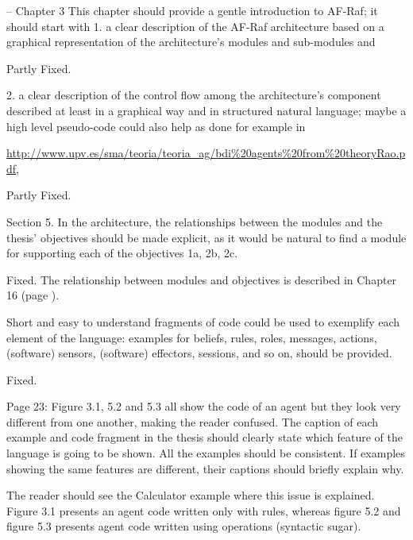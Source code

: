 \documentclass{article}
\newenvironment{them}{\noindent\begingroup\color{blue}}{\endgroup\par}
\begin{document}
\begin{them}

-- Chapter 3
This chapter should provide a gentle introduction to AF-Raf; it should start
with 1. a clear description of the AF-Raf architecture based on a graphical
representation of the architecture's modules and sub-modules and

\end{them}
Partly Fixed. 

\begin{them}

2. a clear description of the control flow among the architecture's component
described at least in a graphical way and in structured natural language; maybe
a high level pseudo-code could also help as done for example in

\url{http://www.upv.es/sma/teoria/teoria_ag/bdi\%20agents\%20from\%20theoryRao.pdf},
\end{them}
Partly Fixed. 

\begin{them}

Section 5.
In the architecture, the relationships between the modules and the thesis'
objectives should be made explicit, as it would be natural to find a module for
supporting each of the objectives 1a, 2b, 2c.

\end{them}
Fixed. The relationship between modules and objectives is described in Chapter
16 (page ).

\begin{them}

Short and easy to understand fragments of code could be used to exemplify each
element of the language: examples for beliefs, rules, roles, messages, actions,
(software) sensors, (software) effectors, sessions, and so on, should be
provided.

\end{them}
Fixed. 

\begin{them}

Page 23:
Figure 3.1, 5.2 and 5.3 all show the code of an agent but they look very
different from one another, making the reader confused. The caption of each
example and code fragment in the thesis should clearly state which feature of
the language is going to be shown. All the examples should be consistent. If
examples showing the same features are different, their captions should briefly
explain why.

\end{them}
The reader should see the Calculator example where this issue is explained.
Figure 3.1 presents an agent code written only with rules, whereas figure 5.2
and figure 5.3 presents agent code written using operations (syntactic sugar).
\end{document}

